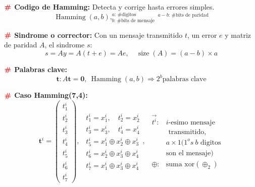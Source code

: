 \documentclass[%
 reprint,
 amsmath,amssymb,
 aps,
]{revtex4-1}
\begin{document}
\textbf{$\color{red}{\textbf{\#}}$ Codigo de Hamming:} Detecta y corrige hasta errores simples.
$$
\operatorname{Hamming}(a, b), 
^{a\text{: \# digitos}}_{b\text{: \# bits de mensaje}}
\
^{a-b\text{: \# bits de paridad}}
$$

\textbf{$\color{red}{\textbf{\#}}$ Sindrome o corrector:} Con un mensaje transmitido $t$, un error $e$ y matriz de paridad $A$, el sindrome $s$:
$$
s=A y=A(t+e)=A e,\quad \operatorname{size}(A) = (a-b) \times a
$$

\textbf{$\color{red}{\textbf{\#}}$ Palabras clave:} 
$$\mathbf{t}:A\mathbf{t}=\mathbf{0},\ \operatorname{Hamming}(a,b) \Rightarrow 2^b \text{palabras clave}$$

\textbf{$\color{red}{\textbf{\#}}$ Caso Hamming(7,4):}
$$
\boldsymbol{t}^{i}=\left(\begin{array}{c}
  t_{1}^{i} \\
  t_{2}^{i} \\
  t_{3}^{i} \\
  t_{4}^{i} \\
  t_{5}^{i} \\
  t_{6}^{i} \\
  t_{7}^{i}
\end{array}\right), \ \
\begin{aligned}
  t_{1}^{i}=x_{1}^{i},\quad t_{2}^{i}=x_{2}^{i} \\
  t_{3}^{i}=x_{3}^{i},\quad t_{4}^{i}=x_{4}^{i} \\
  t_{5}^{i}=x_{1}^{i} \oplus x_{2}^{i} \oplus x_{3}^{i} \\
  t_{6}^{i}=x_{2}^{i} \oplus x_{3}^{i} \oplus x_{4}^{i} \\
  t_{7}^{i}=x_{1}^{i} \oplus x_{3}^{i} \oplus x_{4}^{i}
\end{aligned}, \ \
\begin{aligned}
  \vec{t^i}: & i\text{-esimo mensaje} \\
  &\text{ transmitido},\\
  &a \times 1 (1^os \ b \text{ digitos}\\
  & \text{son el mensaje})\\
  \oplus: & \text{suma xor} (\oplus_2)
\end{aligned}
$$
\end{document}
